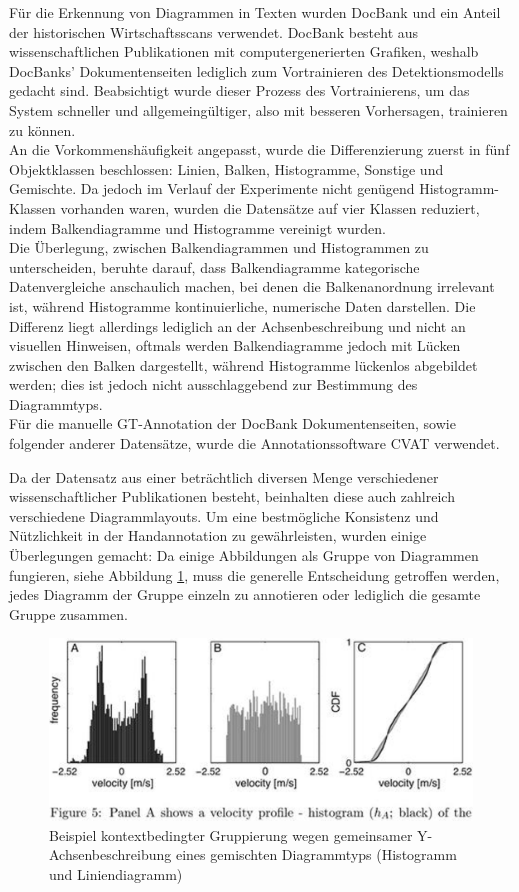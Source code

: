 Für die Erkennung von Diagrammen in Texten wurden DocBank \cite{li2020docbank} und ein Anteil der historischen Wirtschaftsscans verwendet. DocBank besteht aus wissenschaftlichen Publikationen mit computergenerierten Grafiken, weshalb DocBanks' Dokumentenseiten lediglich zum Vortrainieren des Detektionsmodells gedacht sind. Beabsichtigt wurde dieser Prozess des Vortrainierens, um das System schneller und allgemeingültiger, also mit besseren Vorhersagen, trainieren zu können.
\\
An die Vorkommenshäufigkeit angepasst, wurde die Differenzierung zuerst in fünf Objektklassen beschlossen: Linien, Balken, Histogramme, Sonstige und Gemischte. Da jedoch im Verlauf der Experimente nicht genügend Histogramm-Klassen vorhanden waren, wurden die Datensätze auf vier Klassen reduziert, indem Balkendiagramme und Histogramme vereinigt wurden.
\\
Die Überlegung, zwischen Balkendiagrammen und Histogrammen zu unterscheiden, beruhte darauf, dass Balkendiagramme kategorische Datenvergleiche anschaulich machen, bei denen die Balkenanordnung irrelevant ist, während Histogramme kontinuierliche, numerische Daten darstellen. Die Differenz liegt allerdings lediglich an der Achsenbeschreibung und nicht an visuellen Hinweisen, oftmals werden Balkendiagramme jedoch mit Lücken zwischen den Balken dargestellt, während Histogramme lückenlos abgebildet werden; dies ist jedoch nicht ausschlaggebend zur Bestimmung des Diagrammtyps.
\\
Für die manuelle GT-Annotation der DocBank Dokumentenseiten, sowie folgender anderer Datensätze, wurde die Annotationssoftware CVAT \cite{CVAT_ai_Corporation_Computer_Vision_Annotation_2023} verwendet.

Da der Datensatz aus einer beträchtlich diversen Menge verschiedener wissenschaftlicher Publikationen besteht, beinhalten diese auch zahlreich verschiedene Diagrammlayouts. Um eine bestmögliche Konsistenz und Nützlichkeit in der Handannotation zu gewährleisten, wurden einige Überlegungen gemacht: Da einige Abbildungen als Gruppe von Diagrammen fungieren, siehe Abbildung \ref{fig:docbank_example}, muss die generelle Entscheidung getroffen werden, jedes Diagramm der Gruppe einzeln zu annotieren oder lediglich die gesamte Gruppe zusammen.


\begin{figure}[H]
    \centering
    \captionsetup{width=.75\linewidth}
    \includegraphics[width=.75\textwidth]{Methodik/img/docbank_example.png}
    \caption{ Beispiel kontextbedingter Gruppierung wegen gemeinsamer Y-Achsenbeschreibung eines gemischten Diagrammtyps (Histogramm und Liniendiagramm)}
    \label{fig:docbank_example}
\end{figure}


